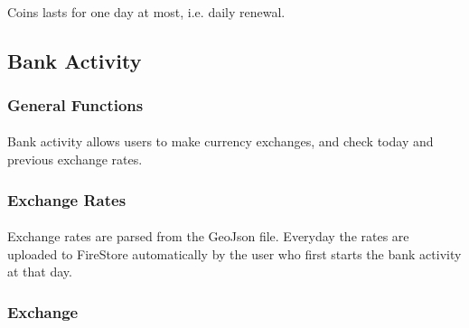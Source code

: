 \documentclass[12pt]{article}
\begin{document}
\paragraph{}
Coins lasts for one day at most, i.e. daily renewal.

\subsection{Bank Activity}
\subsubsection{General Functions}
\paragraph{}
Bank activity allows users to make currency exchanges, and check today and previous exchange rates.
\subsubsection{Exchange Rates}
\paragraph{}
Exchange rates are parsed from the GeoJson file. Everyday the rates are uploaded to FireStore automatically by the user who first starts the bank activity at that day.
\subsubsection{Exchange}
\end{document}
